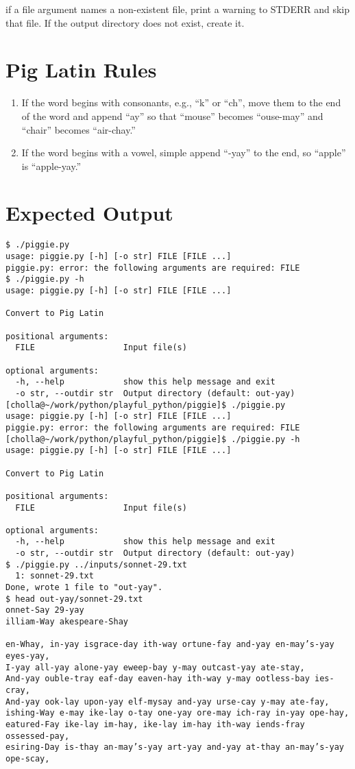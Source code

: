 \documentclass[]{article}
\providecommand{\tightlist}{%
  \setlength{\itemsep}{0pt}\setlength{\parskip}{0pt}}
\begin{document}
if a file argument names a non-existent file, print a warning to STDERR
and skip that file. If the output directory does not exist, create it.

\hypertarget{pig-latin-rules}{%
\section{Pig Latin Rules}\label{pig-latin-rules}}

\begin{enumerate}
\def\labelenumi{\arabic{enumi}.}
\tightlist
\item
  If the word begins with consonants, e.g., ``k'' or ``ch'', move them
  to the end of the word and append ``ay'' so that ``mouse'' becomes
  ``ouse-may'' and ``chair'' becomes ``air-chay.''
\item
  If the word begins with a vowel, simple append ``-yay'' to the end, so
  ``apple'' is ``apple-yay.''
\end{enumerate}

\hypertarget{expected-output}{%
\section{Expected Output}\label{expected-output}}

\begin{verbatim}
$ ./piggie.py
usage: piggie.py [-h] [-o str] FILE [FILE ...]
piggie.py: error: the following arguments are required: FILE
$ ./piggie.py -h
usage: piggie.py [-h] [-o str] FILE [FILE ...]

Convert to Pig Latin

positional arguments:
  FILE                  Input file(s)

optional arguments:
  -h, --help            show this help message and exit
  -o str, --outdir str  Output directory (default: out-yay)
[cholla@~/work/python/playful_python/piggie]$ ./piggie.py
usage: piggie.py [-h] [-o str] FILE [FILE ...]
piggie.py: error: the following arguments are required: FILE
[cholla@~/work/python/playful_python/piggie]$ ./piggie.py -h
usage: piggie.py [-h] [-o str] FILE [FILE ...]

Convert to Pig Latin

positional arguments:
  FILE                  Input file(s)

optional arguments:
  -h, --help            show this help message and exit
  -o str, --outdir str  Output directory (default: out-yay)
$ ./piggie.py ../inputs/sonnet-29.txt
  1: sonnet-29.txt
Done, wrote 1 file to "out-yay".
$ head out-yay/sonnet-29.txt
onnet-Say 29-yay
illiam-Way akespeare-Shay

en-Whay, in-yay isgrace-day ith-way ortune-fay and-yay en-may’s-yay eyes-yay,
I-yay all-yay alone-yay eweep-bay y-may outcast-yay ate-stay,
And-yay ouble-tray eaf-day eaven-hay ith-way y-may ootless-bay ies-cray,
And-yay ook-lay upon-yay elf-mysay and-yay urse-cay y-may ate-fay,
ishing-Way e-may ike-lay o-tay one-yay ore-may ich-ray in-yay ope-hay,
eatured-Fay ike-lay im-hay, ike-lay im-hay ith-way iends-fray ossessed-pay,
esiring-Day is-thay an-may’s-yay art-yay and-yay at-thay an-may’s-yay ope-scay,
\end{verbatim}
\end{document}
